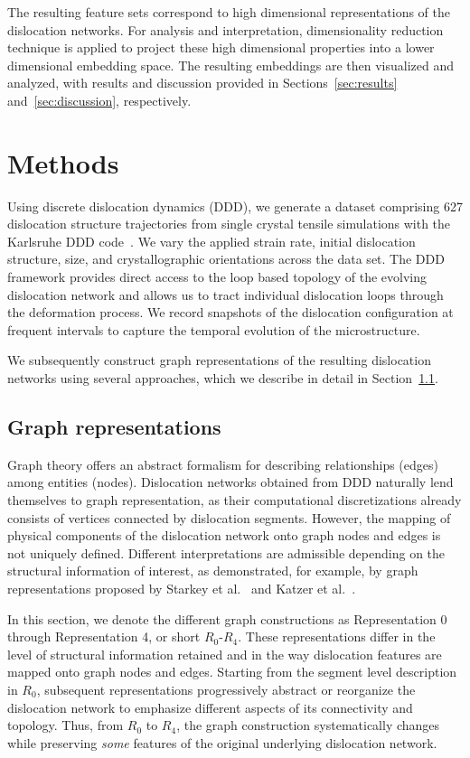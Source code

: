 \documentclass[pdflatex,sn-mathphys-num]{sn-jnl}%
\theoremstyle{thmstyleone}%
\theoremstyle{thmstyletwo}%
\theoremstyle{thmstylethree}%
\begin{document}
The resulting feature sets correspond to high dimensional representations of the dislocation networks. For analysis and interpretation, dimensionality reduction technique is applied to project these high dimensional properties into a lower dimensional embedding space. The resulting embeddings are then visualized and analyzed, with results and discussion provided in Sections~\ref{sec:results} and~\ref{sec:discussion}, respectively.

\section{Methods}\label{Methods}

Using discrete dislocation dynamics (DDD), we generate a dataset comprising 627 dislocation structure trajectories from single crystal tensile simulations with the Karlsruhe DDD code~\cite{D_Weygand_2002, WEYGAND2005}.
We vary the applied strain rate, initial dislocation structure, size, and crystallographic orientations across the data set.
The DDD framework provides direct access to the loop based topology of the evolving dislocation network and allows us to tract individual dislocation loops through the deformation process.
We record snapshots of the dislocation configuration at frequent intervals to capture the temporal evolution of the microstructure.

We subsequently construct graph representations of the resulting dislocation networks using several approaches, which we describe in detail in Section~\ref{subsec:graph_R}.

\subsection{Graph representations}\label{subsec:graph_R}
Graph theory offers an abstract formalism for describing relationships (edges) among entities (nodes). Dislocation networks obtained from DDD naturally lend themselves to graph representation, as their computational discretizations already consists of vertices connected by dislocation segments.
However, the mapping of physical components of the dislocation network onto graph nodes and edges is not uniquely defined.
Different interpretations are admissible depending on the structural information of interest, as demonstrated, for example, by graph representations proposed by Starkey et al.~\cite{STARKEY2022} and Katzer et al.~\cite{KATZER2024115841}.

In this section, we denote the different graph constructions as Representation 0 through Representation 4, or short $R_0$-$R_4$.
These representations differ in the level of structural information retained and in the way dislocation features are mapped onto graph nodes and edges.
Starting from the segment level description in $R_0$, subsequent representations progressively abstract or reorganize the dislocation network to emphasize different aspects of its connectivity and topology.
Thus, from $R_0$ to $R_4$, the graph construction systematically changes while preserving \textit{some} features of the original underlying dislocation network.
\end{document}
